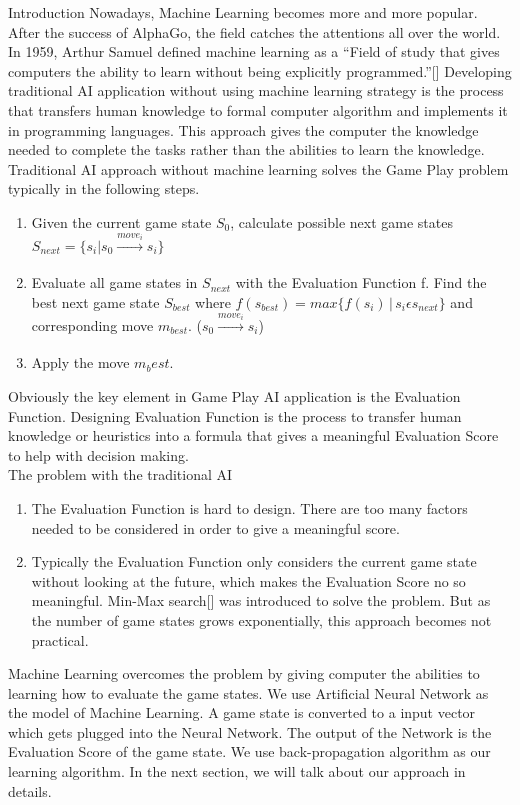 \documentclass{report}
\begin{document}
	Introduction
	Nowadays, Machine Learning becomes more and more popular. After the success of AlphaGo, the field catches the attentions all over the world.  In 1959, Arthur Samuel defined machine
	learning as a ``Field of study that gives computers the ability to learn without being explicitly programmed.''[] Developing traditional AI application without using machine learning
	strategy is the process that transfers human knowledge to formal computer algorithm and implements it in programming languages. This approach gives the computer the knowledge needed
	to complete the tasks rather than the abilities to learn the knowledge. Traditional AI approach without machine learning solves the Game Play problem typically in the following steps.
	\begin{enumerate}
		\item Given the current game state $S_0$, calculate possible next game states $S_{next} = \{s_i|s_0\xrightarrow[]{move_i}s_i\}$

		\item Evaluate all game states in $S_{next}$ with the Evaluation Function f. Find the best next game state $S_{best}$ where $f(s_{best}) = max\{f(s_i)\,|\,s_i \epsilon s_{next}\}$ and corresponding
			move $m_{best}$. ($s_0 \xrightarrow[]{move_i} s_i$)
		\item Apply the move $m_best$.
	\end{enumerate}
	Obviously the key element in Game Play AI application is the Evaluation Function.  Designing Evaluation Function is the process to transfer human knowledge or heuristics into a formula
	that gives a meaningful Evaluation Score to help with decision making.\\
	The problem with the traditional AI
	\begin{enumerate}
		\item The Evaluation Function is hard to design. There are too many factors needed to be considered in order to give a meaningful score. 
		\item Typically the Evaluation Function only considers the current game state without looking at the future, which makes the Evaluation Score no so meaningful.  Min-Max search[] was introduced to solve the problem. But as the number of game states grows exponentially, this approach becomes not practical.
	\end{enumerate}
	Machine Learning overcomes the problem by giving computer the abilities to learning how to evaluate the game states. We use Artificial Neural Network as the model of Machine Learning. A game state is converted to a input vector which gets plugged into the Neural Network. The output of the Network is the Evaluation Score of the game state. We use back-propagation algorithm as our learning algorithm. In the next section, we will talk about our approach in details.
\end{document}
